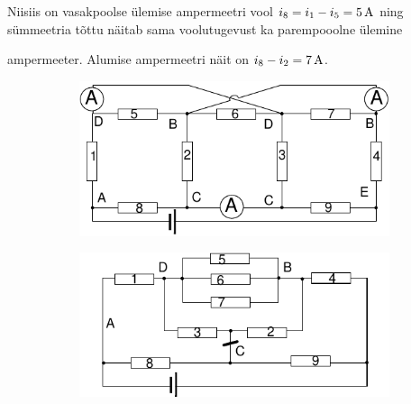Niisiis on vasakpoolse ülemise ampermeetri vool $i_8=i_1-i_5=\SI 5A$ ning sümmeetria tõttu näitab sama voolutugevust ka parempooolne ülemine
 
ampermeeter. Alumise ampermeetri näit on $i_8-i_2=\SI 7A$.\\

\begin{figure}[h]
    \centering
    \begin{subfigure}[h]{0.45\textwidth}
     \includegraphics[width=\textwidth]{2019-v3g-07-yl1.pdf}\\
    \end{subfigure}
    \begin{subfigure}[h]{0.45\textwidth}
    \vspace{-10pt}
     \includegraphics[width=\textwidth]{2019-v3g-07-yl2.pdf}
    \end{subfigure}
 \end{figure}
\probend
